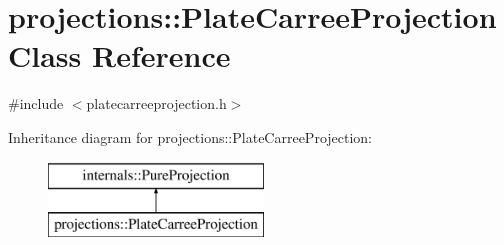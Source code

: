 \hypertarget{classprojections_1_1_plate_carree_projection}{\section{projections\-:\-:\-Plate\-Carree\-Projection \-Class \-Reference}
\label{classprojections_1_1_plate_carree_projection}
}


{\ttfamily \#include $<$platecarreeprojection.\-h$>$}

\-Inheritance diagram for projections\-:\-:\-Plate\-Carree\-Projection\-:\begin{figure}[H]
\begin{center}
\leavevmode
\includegraphics[height=2.000000cm]{classprojections_1_1_plate_carree_projection}
\end{center}
\end{figure}
